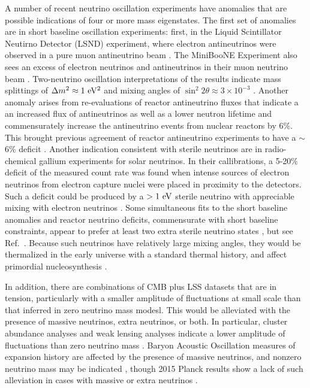 A number of recent neutrino oscillation experiments have anomalies
that are possible indications of four or more mass eigenstates. The
first set of anomalies are in short baseline oscillation experiments:
first, in the Liquid Scintillator Neutirno Detector (LSND) experiment,
where electron antineutrinos were observed in a pure muon antineutrino
beam \cite{Athanassopoulos:1997pv}. The MiniBooNE Experiment also sees
an excess of electron neutrinos and antineutrinos in their muon
neutrino beam \cite{Aguilar-Arevalo:2013pmq}. Two-neutrino oscillation
interpretations of the results indicate mass splittings of $\Delta m^2
\approx 1\rm\ eV^2$ and mixing angles of $\sin^2 2\theta \approx
3\times 10^{-3}$ \cite{Aguilar-Arevalo:2013pmq}. Another anomaly
arises from re-evaluations of reactor antineutrino fluxes that
indicate a an increased flux of antineutrinos as well as a lower
neutron lifetime and commensurately increase the antineutrino events
from nuclear reactors by 6\%. This brought previous agreement of
reactor antineutrino experiments to have a $\sim$6\% deficit
\cite{Mention:2011rk,Huber:2011wv}. Another indication consistent with
sterile neutrinos are in radio-chemical gallium experiments for solar
neutrinos. In their callibrations, a 5-20\% deficit of the measured
count rate was found when intense sources of electron neutrinos from
electron capture nuclei were placed in proximity to the
detectors. Such a deficit could be produced by a $>1\rm\ eV$ sterile
neutrino with appreciable mixing with electron neutrinos
\cite{Bahcall:1994bq,Giunti:2010zu}. Some simultaneous fits to the
short baseline anomalies and reactor neutrino deficits, commensurate
with short baseline constraints, appear to prefer at least two extra
sterile neutrino states \cite{Conrad:2012qt,Kopp:2013vaa}, but see
Ref.~\cite{Giunti:2015mwa}. Because such neutrinos have relatively
large mixing angles, they would be thermalized in the early universe
with a standard thermal history, and affect primordial nucleosynthesis
\cite{Abazajian:2002bj}. 

In addition, there are combinations of CMB plus LSS
datasets that are in tension, particularly with a smaller amplitude of
fluctuations at small scale than that inferred in zero neutrino mass
modesl. This would be alleviated with the
presence of massive neutrinos, extra neutrinos, or both. In particular,
cluster abundance analyses \cite{Wyman:2013lza,Ade:2015fva} and weak lensing analyses
\cite{Battye:2013xqa} indicate a lower amplitude of
fluctuations than zero neutrino mass \cite{Giusarma:2014zza}. Baryon Acoustic
Oscillation measures of expansion history are affected by the presence
of massive neutrinos, and nonzero neutrino mass may be indicated 
\cite{Beutler:2014yhv}, though 2015 Planck results show a lack of such
alleviation in cases with massive or extra neutrinos
\cite{Ade:2015xua}. 


